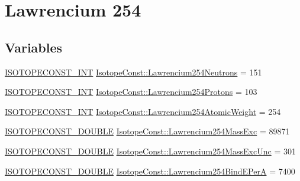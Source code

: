 \hypertarget{group___isotope_const-_lawrencium-_lr254}{}\section{Lawrencium 254}
\label{group___isotope_const-_lawrencium-_lr254}
\subsection*{Variables}
\begin{DoxyCompactItemize}
\item 
\mbox{\hyperlink{group___isotope_const-_macros_ga5f18360b3e99483a35c32d789e62621c}{I\+S\+O\+T\+O\+P\+E\+C\+O\+N\+S\+T\+\_\+\+I\+NT}} \mbox{\hyperlink{group___isotope_const-_lawrencium-_lr254_gafd00b09987388176f9b967e3821e1641}{Isotope\+Const\+::\+Lawrencium254\+Neutrons}} = 151
\item 
\mbox{\hyperlink{group___isotope_const-_macros_ga5f18360b3e99483a35c32d789e62621c}{I\+S\+O\+T\+O\+P\+E\+C\+O\+N\+S\+T\+\_\+\+I\+NT}} \mbox{\hyperlink{group___isotope_const-_lawrencium-_lr254_ga8e3121700f778b56a3f4c00a3adf3297}{Isotope\+Const\+::\+Lawrencium254\+Protons}} = 103
\item 
\mbox{\hyperlink{group___isotope_const-_macros_ga5f18360b3e99483a35c32d789e62621c}{I\+S\+O\+T\+O\+P\+E\+C\+O\+N\+S\+T\+\_\+\+I\+NT}} \mbox{\hyperlink{group___isotope_const-_lawrencium-_lr254_gadc378edae844b30ab45adffb8c982381}{Isotope\+Const\+::\+Lawrencium254\+Atomic\+Weight}} = 254
\item 
\mbox{\hyperlink{group___isotope_const-_macros_ga8f45a7272ce02c0b4c65c44636ed719a}{I\+S\+O\+T\+O\+P\+E\+C\+O\+N\+S\+T\+\_\+\+D\+O\+U\+B\+LE}} \mbox{\hyperlink{group___isotope_const-_lawrencium-_lr254_gab958e9f8b9de0fa476707f8f6c39fcf5}{Isotope\+Const\+::\+Lawrencium254\+Mass\+Exc}} = 89871
\item 
\mbox{\hyperlink{group___isotope_const-_macros_ga8f45a7272ce02c0b4c65c44636ed719a}{I\+S\+O\+T\+O\+P\+E\+C\+O\+N\+S\+T\+\_\+\+D\+O\+U\+B\+LE}} \mbox{\hyperlink{group___isotope_const-_lawrencium-_lr254_ga761b13d779e9bee58fd83b792cf619b6}{Isotope\+Const\+::\+Lawrencium254\+Mass\+Exc\+Unc}} = 301
\item 
\mbox{\hyperlink{group___isotope_const-_macros_ga8f45a7272ce02c0b4c65c44636ed719a}{I\+S\+O\+T\+O\+P\+E\+C\+O\+N\+S\+T\+\_\+\+D\+O\+U\+B\+LE}} \mbox{\hyperlink{group___isotope_const-_lawrencium-_lr254_ga001532d1fe58550c3e4186fbf33ece34}{Isotope\+Const\+::\+Lawrencium254\+Bind\+E\+PerA}} = 7400
\item 

\end{DoxyCompactItemize}
